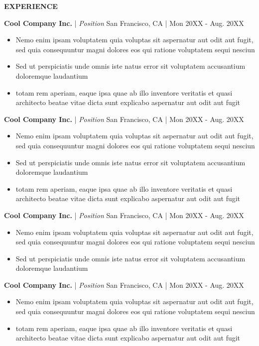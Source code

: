 \documentclass[letterpaper,9pt]{article}
\newcommand{\organization}[4]{
    \vspace{1.5pt}

    \textbf{#1} | \emph{#3} \hfill{#4 | #2}

    \vspace{14pt}
}
\newcommand{\bulletsBegin}{
    \vspace{-8pt}
    \begin{minipage}{16.5cm} 
    \begin{itemize}[leftmargin=0.6cm]
    \setlength\itemsep{-0.05em}
}
\newcommand{\bulletsEnd}{
    \end{itemize}\vspace{0pt}
    \end{minipage}
}
\newcommand{\resumeSection}[1]{
    \vspace{8pt}
    \hspace{15pt} \textbf{\color{bluee}#1}
    \vspace{2pt}
}
\begin{document}
    \resumeSection{EXPERIENCE}
    \begin{siderules}[style=burgundyline]
            \vspace{-6pt}


            \organization{Cool Company Inc.}{Mon 20XX - Aug. 20XX}
            {Position}{San Francisco, CA}
            \bulletsBegin
                \item Nemo enim ipsam voluptatem quia voluptas sit aspernatur aut odit aut fugit, sed quia consequuntur magni dolores eos qui ratione voluptatem sequi nesciun
                \item Sed ut perspiciatis unde omnis iste natus error sit voluptatem accusantium doloremque laudantium
                \item totam rem aperiam, eaque ipsa quae ab illo inventore veritatis et quasi architecto beatae vitae dicta sunt explicabo aspernatur aut odit aut fugit
            \bulletsEnd
    
            \organization{Cool Company Inc.}{Mon 20XX - Aug. 20XX}
            {Position}{San Francisco, CA}
            \bulletsBegin
                \item Nemo enim ipsam voluptatem quia voluptas sit aspernatur aut odit aut fugit, sed quia consequuntur magni dolores eos qui ratione voluptatem sequi nesciun
                \item Sed ut perspiciatis unde omnis iste natus error sit voluptatem accusantium doloremque laudantium
                \item totam rem aperiam, eaque ipsa quae ab illo inventore veritatis et quasi architecto beatae vitae dicta sunt explicabo aspernatur aut odit aut fugit
            \bulletsEnd
    
            \organization{Cool Company Inc.}{Mon 20XX - Aug. 20XX}
            {Position}{San Francisco, CA}
            \bulletsBegin
                \item Nemo enim ipsam voluptatem quia voluptas sit aspernatur aut odit aut fugit, sed quia consequuntur magni dolores eos qui ratione voluptatem sequi nesciun
                \item Sed ut perspiciatis unde omnis iste natus error sit voluptatem accusantium doloremque laudantium
            \bulletsEnd
    
            \organization{Cool Company Inc.}{Mon 20XX - Aug. 20XX}
            {Position}{San Francisco, CA}
            \bulletsBegin
                \item Nemo enim ipsam voluptatem quia voluptas sit aspernatur aut odit aut fugit, sed quia consequuntur magni dolores eos qui ratione voluptatem sequi nesciun
                \item totam rem aperiam, eaque ipsa quae ab illo inventore veritatis et quasi architecto beatae vitae dicta sunt explicabo aspernatur aut odit aut fugit
            \bulletsEnd


\end{siderules}
\end{document}
